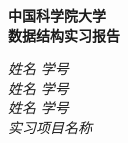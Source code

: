 \begin{center}
    \LARGE \bf 中国科学院大学 \\数据结构实习报告
\end{center}

\begin{center}
    \emph{姓名} \underline{\makebox[7em][c]{\namea}}
    \emph{学号} \underline{\makebox[12em][c]{\studentNuma}} \\
    \emph{姓名} \underline{\makebox[7em][c]{\nameb}}
    \emph{学号} \underline{\makebox[12em][c]{\studentNumb}} \\
    \emph{姓名} \underline{\makebox[7em][c]{\namec}}
    \emph{学号} \underline{\makebox[12em][c]{\studentNumc}} \\
    \emph{实习项目名称} \underline{\makebox[17em][c]{\labName}} \\
\end{center}
